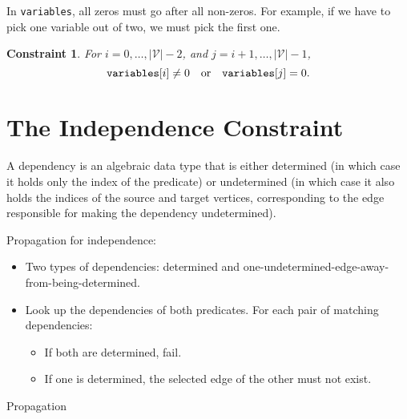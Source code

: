 \documentclass{article}
\newtheorem{constraint}{Constraint}
\theoremstyle{definition}
\newcommand{\variable}[1]{\texttt{\textup{#1}}}
\newcommand{\variables}{\mathcal{V}}
\begin{document}
In \variable{variables}, all zeros must go after all non-zeros. For example,
if we have to pick one variable out of two, we must pick the first one.
\begin{constraint}
  For $i = 0, \dots, |\variables{}| - 2$, and $j = i + 1, \dots,
  |\variables{}| - 1$,
  \[
    \variable{variables}[i] \ne 0 \quad \text{or} \quad \variable{variables}[j]
    = 0.
  \]
\end{constraint}

\section{The Independence Constraint}

A dependency is an algebraic data type that is either determined (in which case
it holds only the index of the predicate) or undetermined (in which case it also
holds the indices of the source and target vertices, corresponding to the edge
responsible for making the dependency undetermined).

Propagation for independence:
\begin{itemize}
\item Two types of dependencies: determined and
  one-undetermined-edge-away-from-being-determined.
\item Look up the dependencies of both predicates. For each pair of
  matching dependencies:
  \begin{itemize}
  \item If both are determined, fail.
  \item If one is determined, the selected edge of the other must not
    exist.
  \end{itemize}
\end{itemize}

\begin{algorithm}
  \caption{Propagation}
\end{algorithm}
\end{document}
